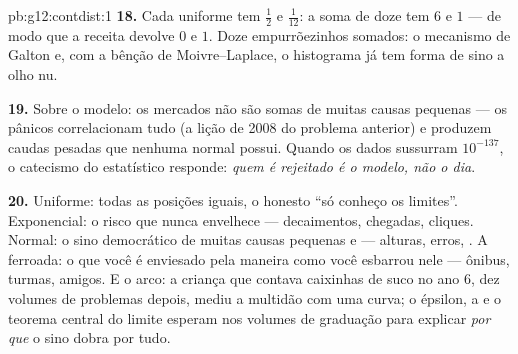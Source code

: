 \begin{solution}{pb:g12:contdist:1}
\textbf{18.} Cada uniforme tem  $\frac12$ e 
$\frac{1}{12}$: a soma de doze tem  $6$ e  $1$
--- de modo que a receita devolve  $0$ e  $1$.
Doze empurrõezinhos  somados: o mecanismo de
Galton e, com a bênção de Moivre--Laplace, o histograma já
tem forma de sino a olho nu.

\textbf{19.} Sobre o modelo: os mercados não são somas de
muitas causas pequenas \emph{} --- os pânicos
correlacionam tudo (a lição de 2008 do problema anterior) e
produzem caudas pesadas que nenhuma  normal possui.
Quando os dados sussurram $10^{-137}$, o catecismo do
estatístico responde: \emph{quem é rejeitado é o modelo, não o
dia}.

\textbf{20.} Uniforme: todas as posições iguais, o honesto ``só
conheço os limites''. Exponencial: o risco que nunca
envelhece --- decaimentos, chegadas, cliques. Normal: o sino
democrático de muitas causas pequenas e  ---
alturas, erros, . A ferroada: o que você  é
enviesado pela maneira como você esbarrou nele --- ônibus,
turmas, amigos. E o arco: a criança que contava caixinhas de
suco no ano 6, dez volumes de problemas depois, mediu a
multidão com uma curva; o épsilon, a  e o teorema
central do limite esperam nos volumes de graduação para
explicar \emph{por que} o sino dobra por tudo.
\end{solution}
